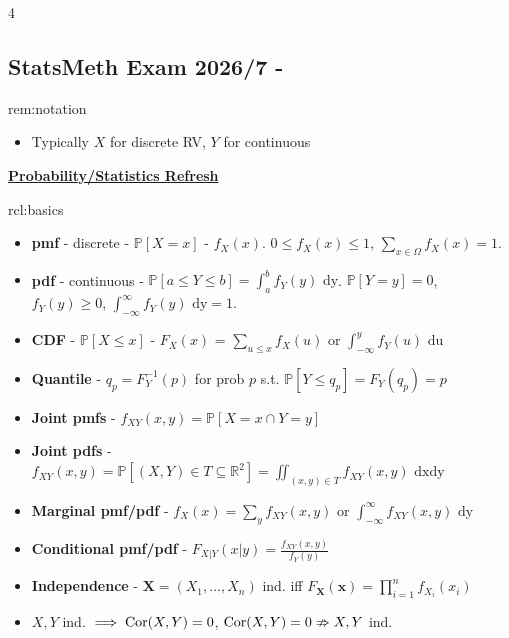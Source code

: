 \documentclass[landscape, 8pt]{extarticle}
\begin{document}
\begin{multicols*}{4}
	\raggedcolumns 
	\vspace{-5pt}
	\subsection*{StatsMeth Exam 2026/7 - }
	\vspace{-5pt}
	
		\begin{rem}[Notation]{rem:notation}{ }
			\begin{itemize}
				\item Typically $X$ for discrete RV, $Y$ for continuous
			\end{itemize}
			
		\end{rem}
		
		

{\footnotesize \textbf{\underline{Probability/Statistics Refresh}}}
		
		
		\begin{rcl}[Basics]{rcl:basics}{ }
			\begin{itemize}
				\item \textbf{pmf} - discrete - $\mathbb{P}[X = x]$ - $f_X(x)$. $0 \le f_X(x) \le 1$, $\sum_{x\in \Omega} f_X(x) = 1$.
				\item \textbf{pdf} - continuous - $\mathbb{P}[a \le Y \le b] = \int_{a}^{b}f_Y(y) \text{ dy}$. $\mathbb{P}[Y = y] = 0$, $f_Y(y) \ge 0$, $\int_{-\infty}^{\infty} f_Y(y) \text{ dy} = 1$.
				\item \textbf{CDF} - $\mathbb{P}[X \le x]$ - $F_X (x)$ = $\sum_{u \le x} f_X(u)$ or $\int_{-\infty}^{y} f_Y(u) \text{ du}$
				\item \textbf{Quantile} - $q_p = F^{-1}_Y(p)$ for prob $p$ s.t. $\mathbb{P}[Y \le q_p] = F_Y(q_p) = p$
				\item \textbf{Joint pmfs} - $f_{XY} (x, y) = \mathbb{P}[X = x \cap Y = y]$
				\item \textbf{Joint pdfs} - $f_{XY} (x, y) = \mathbb{P}[(X, Y)\in T \subseteq \mathbb{R}^2] = \iint_{(x, y)\in T} f_{XY} (x, y) \text{ dxdy}$
				\item \textbf{Marginal pmf/pdf} - $f_X(x) = \sum_{y} f_{XY} (x, y)$ or $\int_{-\infty}^{\infty}f_{XY} (x, y) \text{ dy}$
				\item \textbf{Conditional pmf/pdf} - $F_{X|Y} (x | y) = \frac{f_{XY} (x, y)}{f_Y(y)}$
				\item \textbf{Independence} - $\bm{X} = (X_1, \dots, X_n)$ ind. iff $F_{\bm{X}} (\bm{x}) = \prod_{i=1}^{n}f_{X_i} (x_i)$
				\item $X, Y$ ind. $\implies \operatorname{Cor} (X, Y) = 0$, $\operatorname{Cor} (X, Y) = 0 \nRightarrow X, Y$ ind.
			\end{itemize}
			

\end{rcl}
\end{multicols*}
\end{document}
